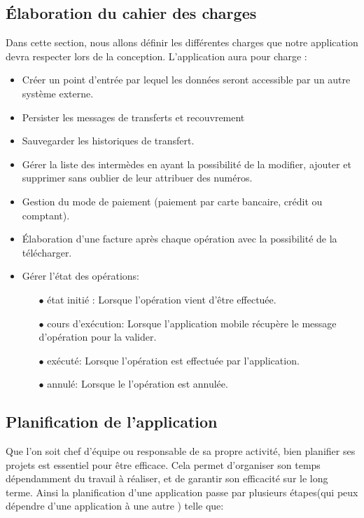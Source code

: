 \subsection{Élaboration du cahier des charges}
	
	Dans cette section, nous allons définir les différentes charges que notre application devra respecter lors de la conception.
	L'application aura pour charge :
	\begin{itemize}
		\item Créer un point d'entrée par lequel les données seront accessible par un autre système externe.\\
		\item Persister les messages de transferts et recouvrement\\
		\item Sauvegarder les historiques de transfert.\\
		\item Gérer la liste des intermèdes en ayant la possibilité de la modifier, ajouter et supprimer sans oublier de leur attribuer des numéros.\\
		\item Gestion du mode de paiement (paiement par carte bancaire, crédit ou comptant).\\
		\item Élaboration d'une facture après chaque opération avec la possibilité de la télécharger.\\
		\item Gérer l'état des opérations:\\
			\begin{itemize}
				\item[$\bullet$]  état initié : Lorsque l'opération vient d'être effectuée.\\
				\item[$\bullet$] cours d'exécution: Lorsque l'application mobile récupère le message d'opération pour la valider.\\
				\item[$\bullet$] exécuté: Lorsque l'opération est effectuée par l'application.\\
				\item[$\bullet$] annulé: Lorsque le l'opération est annulée.
			\end{itemize}
	\end{itemize}

\subsection{Planification de l'application}
	Que l’on soit chef d’équipe ou responsable de sa propre activité, bien planifier ses projets est essentiel pour être efficace. Cela permet d’organiser son temps dépendamment du travail à réaliser, et de garantir son efficacité sur le long terme. Ainsi la planification d'une application passe par plusieurs étapes(qui peux dépendre d'une application à une autre ) telle que:\\
	
